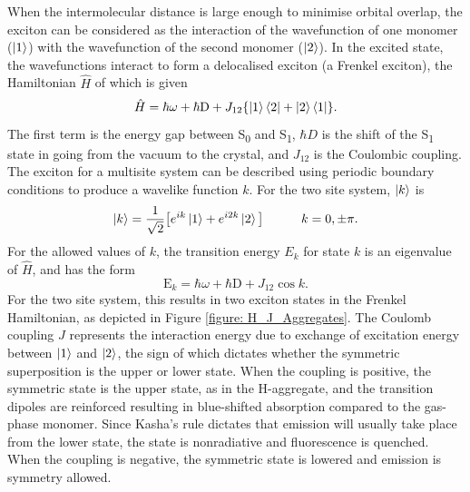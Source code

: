 When the intermolecular distance is large enough to minimise
orbital overlap, the exciton can be considered as the interaction of the wavefunction of one monomer ($\ket{1}$) with the wavefunction of the second monomer ($\ket{2}$). In the excited state, the  wavefunctions interact to form a delocalised exciton (a Frenkel exciton), the Hamiltonian $\hat{H}$ of which is given
\begin{equation}
\hat{H}=\hbar\omega + \mathrm{\hbar{}D} + J_{12}\{\ket{1}\bra{2}+\ket{2}\bra{1}\}.
\end{equation}
The first term is the energy gap between S\textsubscript{0} and S\textsubscript{1},  $\hbar{}D$ is the shift of the S\textsubscript{1} state in going from the vacuum to the crystal, and $J_{12}$ is the Coulombic coupling.\cite{Spano} The exciton for a multisite system can be described using periodic boundary conditions to produce a wavelike function $k$. For the two site system, $\ket{k}$ is\cite{Hestand2018}
\begin{equation}
\ket{k}=\frac{1}{\sqrt{2}}\big[e^{ik}\ket{1}+  e^{i2k}\ket{2}\big]\qquad\quad k=0,\pm{\pi}.
\end{equation}
For the allowed values of $k$, the transition energy $E_k$ for state $k$ is an eigenvalue of $\hat{H}$, and has the form
\begin{equation}
\mathrm{E}_{k}=\hbar\omega + \mathrm{\hbar{}D} +J_{12}\cos{k}.
\end{equation}
For the two site system, this results in two exciton states in the Frenkel Hamiltonian, as depicted in Figure \ref{figure: H_J_Aggregates}. The Coulomb coupling $J$ represents the interaction energy due to exchange of excitation energy between $\ket{1}$ and $\ket{2}$, the sign of which dictates whether the symmetric superposition is the upper or lower state. When the coupling is positive, the symmetric state is the upper state, as in the H-aggregate, and the transition dipoles are reinforced resulting in blue-shifted absorption compared to the gas-phase monomer. Since Kasha's rule dictates that emission will usually take place from the lower state, the state is nonradiative and fluorescence is quenched.\cite{Kasha1950} When the coupling is negative, the symmetric state is lowered and emission is symmetry allowed.\cite{Hestand2017}
